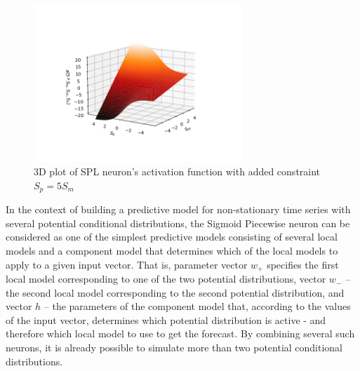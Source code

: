 \documentclass[sn-apa]{sn-jnl}%
\begin{document}
\begin{figure}[H]
\centering
\includegraphics[width=0.7\textwidth]{spl_neuron_3d_plot_with_constraint_sp_eq_5sm.png}
\caption{3D plot of SPL neuron's activation function with added constraint $S_p=5S_m$}\label{fig4}
\end{figure}

In the context of building a predictive model for non-stationary time series with several potential conditional distributions, the Sigmoid Piecewise neuron can be considered as one of the simplest predictive models consisting of several local models and a component model that determines which of the local models to apply to a given input vector. That is, parameter vector $w_+$ specifies the first local model corresponding to one of the two potential distributions, vector $w_-$ – the second local model corresponding to the second potential distribution, and vector $h$ – the parameters of the component model that, according to the values of the input vector, determines which potential distribution is active - and therefore which local model to use to get the forecast. By combining several such neurons, it is already possible to simulate more than two potential conditional distributions. 
 
\end{document}
